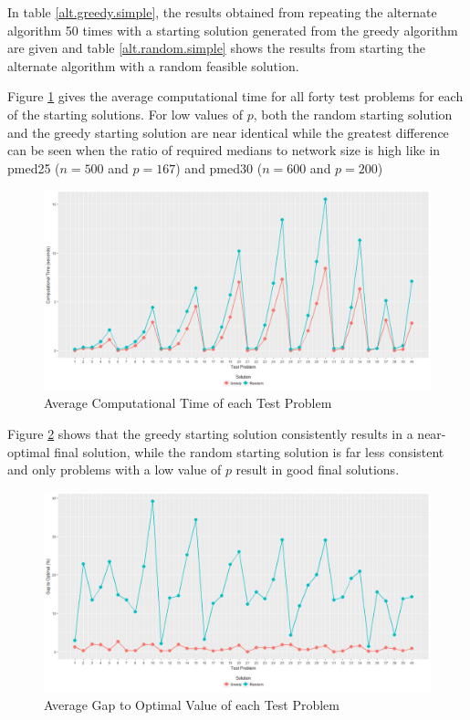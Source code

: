 \documentclass[11pt]{article}
\begin{document}
	In table \ref{alt.greedy.simple}, the results obtained from repeating the alternate algorithm 50 times with a starting solution generated from the greedy algorithm are given and table \ref{alt.random.simple} shows the results from starting the alternate algorithm with a random feasible solution.
	
	Figure \ref{Alttime} gives the average computational time for all forty test problems for each of the starting solutions.  For low values of $p$, both the random starting solution and the greedy starting solution are near identical while the greatest difference can be seen when the ratio of required medians to network size is high like in pmed25 ($n = 500$ and $p=167$) and pmed30 ($n = 600$ and $p=200$)
	
				\begin{figure}[H]
					\begin{center}
						\includegraphics[width=14cm]{Alttime.png}
						\caption{Average Computational Time of each Test Problem}
						\label{Alttime}
					\end{center}
				\end{figure}
	
	Figure \ref{Altgap} shows that the greedy starting solution consistently results in a near-optimal final solution, while the random starting solution is far less consistent and only problems with a low value of $p$ result in good final solutions.
				
				\begin{figure}[H]
					\begin{center}
						\includegraphics[width=14cm]{Altgap.png}
						\caption{Average Gap to Optimal Value of each Test Problem}
						\label{Altgap}
					\end{center}
				\end{figure}
				
\end{document}
